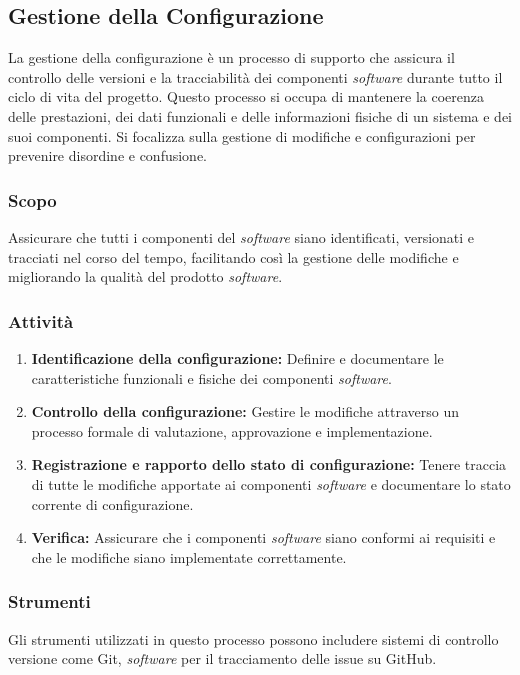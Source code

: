 \subsection{Gestione della Configurazione}

La gestione della configurazione è un processo di supporto che assicura il
controllo delle versioni e la tracciabilità dei componenti \textit{software}
durante tutto il ciclo di vita del progetto.
Questo processo si occupa di mantenere la coerenza delle prestazioni, dei dati
funzionali e delle informazioni fisiche di un sistema e dei suoi componenti.
Si focalizza sulla gestione di modifiche e configurazioni per prevenire
disordine e confusione.

\subsubsection{Scopo}
Assicurare che tutti i componenti del \textit{software} siano identificati,
versionati e tracciati nel corso del tempo, facilitando così la gestione delle
modifiche e migliorando la qualità del prodotto \textit{software}.

\subsubsection{Attività}
\begin{enumerate}
	\item \textbf{Identificazione della configurazione:} Definire e documentare
	      le caratteristiche funzionali e fisiche dei componenti
	      \textit{software}.
	\item \textbf{Controllo della configurazione:} Gestire le modifiche
	      attraverso un processo formale di valutazione, approvazione e
	      implementazione.
	\item \textbf{Registrazione e rapporto dello stato di configurazione:}
	      Tenere traccia di tutte le modifiche apportate ai componenti
	      \textit{software} e documentare lo stato corrente di configurazione.
	\item \textbf{Verifica:} Assicurare che i componenti \textit{software} siano
	      conformi ai requisiti e che le modifiche siano implementate
	      correttamente.
\end{enumerate}

\subsubsection{Strumenti}
Gli strumenti utilizzati in questo processo possono includere sistemi di
controllo versione come Git, \textit{software} per il tracciamento delle issue
su GitHub.
